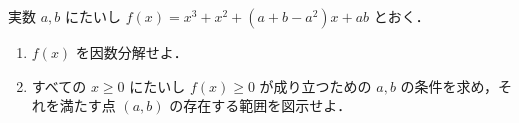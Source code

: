 \documentclass[../../main.tex]{subfiles}
\begin{document}
実数 $a, b$ にたいし $f(x) = x^3 + x^2 + (a+b-a^2)x + ab$ とおく．

\begin{enumerate}
  \item $f(x)$ を因数分解せよ．
  \item すべての $x \ge 0$ にたいし $f(x) \ge 0$ が成り立つための $a, b$ の条件を求め，それを満たす点 $(a, b)$ の存在する範囲を図示せよ．
\end{enumerate}
\end{document}
